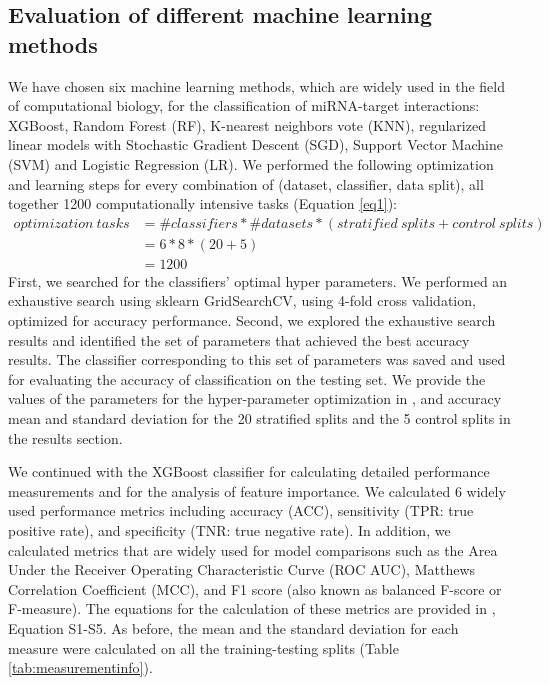 \documentclass{bmcart}
\begin{document}
\subsection*{Evaluation of different machine learning methods} \label{method_ml_methods}
We have chosen six machine learning methods, which are widely used in the field of computational biology, for the classification of miRNA-target interactions: XGBoost\cite{xgboost}, Random Forest (RF), K-nearest neighbors vote (KNN), regularized linear models with Stochastic Gradient Descent (SGD), Support Vector Machine (SVM) and Logistic Regression (LR).
We performed the following optimization and learning steps for every combination of (dataset, classifier, data split), all together 1200 computationally intensive tasks (Equation \ref{eq1}):
\begin{equation} \label{eq1}
\begin{split}
optimization \: tasks & = \#classifiers * \#datasets * \left (stratified\: splits + control\: splits \right ) \\
 & = 6*8*( 20 + 5 ) \\
 & = 1200
\end{split}
\end{equation}
First, we searched for the classifiers' optimal hyper parameters. We performed an exhaustive search using sklearn GridSearchCV, using 4-fold cross validation, optimized for accuracy performance. Second, we explored the exhaustive search results and identified the set of parameters that achieved the best accuracy results. The classifier corresponding to this set of parameters was saved and used for evaluating the accuracy of classification on the testing set. We provide the values of the parameters for the hyper-parameter optimization in , and accuracy mean and standard deviation for the 20 stratified splits and the 5 control splits in the results section.

We continued with the XGBoost classifier for calculating detailed performance measurements and for the analysis of feature importance. We calculated 6 widely used performance metrics including accuracy (ACC), sensitivity (TPR: true positive rate), and specificity (TNR: true negative rate). In addition, we calculated metrics that are widely used for model comparisons such as the Area Under the Receiver Operating Characteristic Curve (ROC AUC), Matthews Correlation Coefficient (MCC), and F1 score (also known as balanced F-score or F-measure). The equations for the calculation of these metrics are provided in , Equation S1-S5.
As before, the mean and the standard deviation for each measure were calculated on all the training-testing splits (Table \ref{tab:measurementinfo}).
\end{document}

